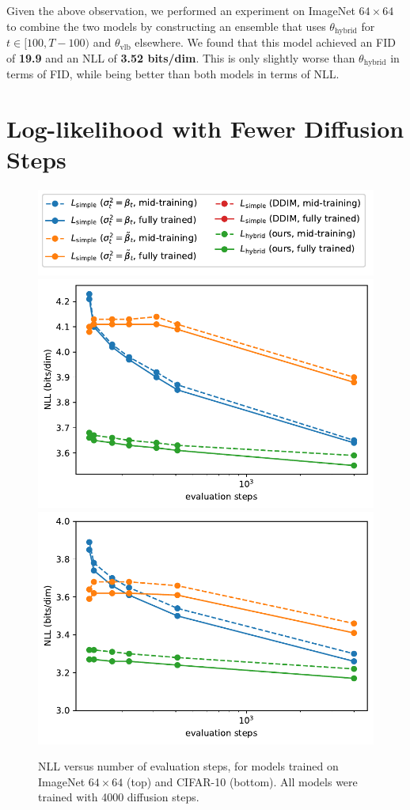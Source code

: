 \documentclass{article}
\begin{document}
Given the above observation, we performed an experiment on ImageNet $64 \times 64$ to combine the two models by constructing an ensemble that uses $\theta_{\text{hybrid}}$ for $t \in [100, T-100)$ and $\theta_{\text{vlb}}$ elsewhere. We found that this model achieved an FID of \textbf{19.9} and an NLL of \textbf{3.52 bits/dim}. This is only slightly worse than $\theta_{\text{hybrid}}$ in terms of FID, while being better than both models in terms of NLL.

\newpage
\section{Log-likelihood with Fewer Diffusion Steps}

\begin{figure}[ht]
    \centering
    \includegraphics[width=0.85\columnwidth]{fid_vs_steps_cifar_legend-eps.pdf}
    \includegraphics[width=\columnwidth]{nll_vs_steps-eps.pdf}
    \includegraphics[width=\columnwidth]{nll_vs_steps_cifar-eps.pdf}
    \caption{\label{fig:nllvssteps} NLL versus number of evaluation steps, for models trained on ImageNet $64 \times 64$ (top) and CIFAR-10 (bottom). All models were trained with 4000 diffusion steps.}
\end{figure}
\end{document}
